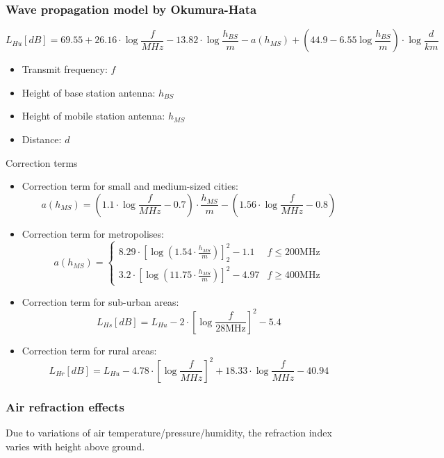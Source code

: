 \subsubsection{Wave propagation model by Okumura-Hata}
\begin{equation}\label{eq:okumura-hata}
L_{H u}[d B]=69.55+26.16 \cdot \log \frac{f}{M H z}-13.82 \cdot \log \frac{h_{B S}}{m}-a\left(h_{M S}\right)+\left(44.9-6.55 \log \frac{h_{B S}}{m}\right) \cdot \log \frac{d}{k m}
\end{equation}
\begin{itemize}
    \item Transmit frequency: $f$
    \item Height of base station antenna: $h_{BS}$
    \item Height of mobile station antenna: $h_{MS}$
    \item Distance: $d$
\end{itemize}
Correction terms
\begin{itemize}
    \item Correction term for small and medium-sized cities:
    $$
    a\left(h_{M S}\right)=\left(1.1 \cdot \log \frac{f}{M H z}-0.7\right) \cdot \frac{h_{M S}}{m}-\left(1.56 \cdot \log \frac{f}{M H z}-0.8\right)
    $$
    \item Correction term for metropolises:
    $$
    a\left(h_{M S}\right)= \begin{cases}8.29 \cdot\left[\log \left(1.54 \cdot \frac{h_{M S}}{m}\right)\right]_2^2-1.1 & f \leqslant 200 \mathrm{MHz} \\ 3.2 \cdot\left[\log \left(11.75 \cdot \frac{h_{M S}}{m}\right)\right]^2-4.97 & f \geqslant 400 \mathrm{MHz}\end{cases}
    $$
    \item Correction term for sub-urban areas:
    $$
    L_{H s}[d B]=L_{H u}-2 \cdot\left[\log \frac{f}{28 \mathrm{MHz}}\right]^2-5.4
    $$
    \item Correction term for rural areas:
    $$
    L_{H r}[d B]=L_{H u}-4.78 \cdot\left[ \log \frac{f}{M H z}\right]^2+18.33 \cdot \log \frac{f}{M H z}-40.94
    $$
\end{itemize}




\subsubsection{Air refraction effects}
Due to variations of air temperature/pressure/humidity, the refraction index varies with height above ground.
